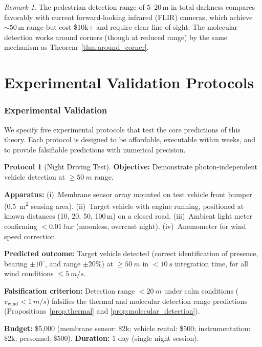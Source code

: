 \documentclass[11pt,twocolumn,a4paper]{article}
\theoremstyle{plain}
\theoremstyle{definition}
\newtheorem{protocol}[theorem]{Protocol}
\theoremstyle{remark}
\newtheorem{remark}[theorem]{Remark}
\begin{document}
\begin{remark}
The pedestrian detection range of 5--20\,m in total darkness compares favorably with current forward-looking infrared (FLIR) cameras, which achieve $\sim 50$\,m range but cost \$10k+ and require clear line of sight. The molecular detection works around corners (though at reduced range) by the same mechanism as Theorem~\ref{thm:around_corner}.
\end{remark}





\part{Experimental Validation Protocols}
\label{part:experiments}

\section{Experimental Validation}
\label{sec:experiments}

We specify five experimental protocols that test the core predictions of this theory. Each protocol is designed to be affordable, executable within weeks, and to provide falsifiable predictions with numerical precision.

\begin{protocol}[Night Driving Test]
\label{prot:night}
\textbf{Objective:} Demonstrate photon-independent vehicle detection at $\geq \SI{50}{m}$ range.

\textbf{Apparatus:} (i)~Membrane sensor array mounted on test vehicle front bumper (\SI{0.5}{m^2} sensing area). (ii)~Target vehicle with engine running, positioned at known distances (10, 20, 50, 100\,m) on a closed road. (iii)~Ambient light meter confirming $< \SI{0.01}{lux}$ (moonless, overcast night). (iv)~Anemometer for wind speed correction.

\textbf{Predicted outcome:} Target vehicle detected (correct identification of presence, bearing $\pm 10^\circ$, and range $\pm 20\%$) at $\geq \SI{50}{m}$ in $< \SI{10}{s}$ integration time, for all wind conditions $\leq \SI{5}{m/s}$.

\textbf{Falsification criterion:} Detection range $< \SI{20}{m}$ under calm conditions ($v_{\mathrm{wind}} < \SI{1}{m/s}$) falsifies the thermal and molecular detection range predictions (Propositions~\ref{prop:thermal} and \ref{prop:molecular_detection}).

\textbf{Budget:} \$5{,}000 (membrane sensor: \$2k; vehicle rental: \$500; instrumentation: \$2k; personnel: \$500). \textbf{Duration:} 1 day (single night session).
\end{protocol}
\end{document}
